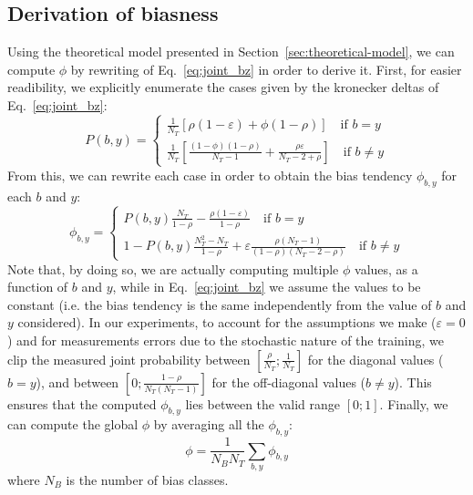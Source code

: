 \subsection{Derivation of biasness}
\label{appendix:v-derivation}
Using the theoretical model presented in Section~\ref{sec:theoretical-model}, we can compute $\phi$ by rewriting of Eq.~\ref{eq:joint_bz} in order to derive it. First, for easier readibility, we explicitly enumerate the cases given by the kronecker deltas of Eq.~\ref{eq:joint_bz}:
\begin{equation}
    P(b, y) = 
\begin{cases}
    \frac{1}{N_T} \left[\rho (1 - \varepsilon) + \phi(1-\rho) \right] \quad \text{if } b=y \\[2ex]
	\frac{1}{N_T}\left [\frac{(1-\phi)(1-\rho)}{N_T-1} + \frac{\rho\varepsilon}{N_T-2+\rho} \right]  \quad \text{if } b \neq y
\end{cases}
\end{equation}
From this, we can rewrite each case in order to obtain the bias tendency $\phi_{b,y}$ for each $b$ and $y$:
\begin{equation}
    \phi_{b,y} = 
\begin{cases}
     P(b, y)\frac{N_T}{1 - \rho} - \frac{\rho(1-\varepsilon)}{1 - \rho} \quad \text{if } b = y \\[2ex]
     1 - P(b,y)\frac{N_T^2-N_T}{1-\rho} + \varepsilon\frac{\rho(N_T-1)}{(1-\rho)(N_T-2-\rho)} \quad \text{if } b \neq y
\end{cases}
\end{equation}
Note that, by doing so, we are actually computing multiple $\phi$ values, as a function of $b$ and $y$, while in Eq.~\ref{eq:joint_bz} we assume the values to be constant (i.e. the bias tendency is the same independently from the value of $b$ and $y$ considered). 
In our experiments, to account for the assumptions we make ($\varepsilon = 0$) and for measurements errors due to the stochastic nature of the training, we clip the measured joint probability between $[\frac{\rho}{N_T}; \frac{1}{N_T}]$ for the diagonal values ($b=y$), and between $[0; \frac{1-\rho}{N_T(N_T-1)}]$ for the off-diagonal values ($b \neq y$). This ensures that the computed $\phi_{b,y}$ lies between the valid range $[0; 1]$.
Finally, we can compute the global $\phi$ by averaging all the $\phi_{b,y}$:
\begin{equation}
\phi = \frac{1}{N_B N_T}\sum_{b,y} \phi_{b,y}
\end{equation}
where $N_B$ is the number of bias classes.
 


